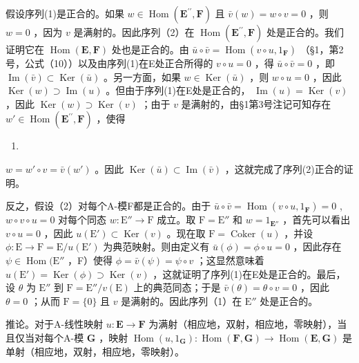 假设序列(1)是正合的。如果 \(w \in \operatorname{Hom}(\mathbf{E}^{\prime \prime}, \mathbf{F})\) 且 \(\bar{v}(w) = w \circ v = 0\) ，则 \(w = 0\) ，因为 \(v\) 是满射的。因此序列（2）在 \(\operatorname{Hom}(\mathbf{E}^{\prime \prime}, \mathbf{F})\) 处是正合的。我们证明它在 \(\operatorname{Hom}(\mathbf{E}, \mathbf{F})\) 处也是正合的。由 \(\bar{u} \circ \bar{v} = \operatorname{Hom}(v \circ u, 1_{\mathbf{F}})\) （§1，第2号，公式（10））以及由序列(1)在E处正合所得的 \(v \circ u = 0\) ，得 \(\bar{u} \circ \bar{v} = 0\) ，即 \(\operatorname{Im}(\bar{v}) \subset \operatorname{Ker}(\bar{u})\) 。另一方面，如果 \(w \in \operatorname{Ker}(\bar{u})\) ，则 \(w \circ u = 0\) ，因此 \(\operatorname{Ker}(w) \supset \operatorname{Im}(u)\) 。但由于序列(1)在E处是正合的， \(\operatorname{Im}(u) = \operatorname{Ker}(v)\) ，因此 \(\operatorname{Ker}(w) \supset \operatorname{Ker}(v)\) ；由于 \(v\) 是满射的，由§1第3号注记可知存在 \(w' \in \operatorname{Hom}(\mathbf{E}^{\prime \prime}, \mathbf{F})\) ，使得

\begin{enumerate}
\def\labelenumi{(\arabic{enumi})}
\setcounter{enumi}{3}
\tightlist
\item
\end{enumerate}

\(w = w' \circ v = \bar{v}(w')\) 。因此 \(\operatorname{Ker}(\bar{u}) \subset \operatorname{Im}(\bar{v})\) ，这就完成了序列(2)正合的证明。

反之，假设（2）对每个A-模F都是正合的。由于 \(\bar{u} \circ \bar{v} = \operatorname{Hom}(v \circ u, 1_{\mathbf{F}}) = 0\) , \(w \circ v \circ u = 0\) 对每个同态 \(w: \mathrm{E}'' \to \mathrm{F}\) 成立。取 \(\mathrm{F} = \mathrm{E}''\) 和 \(w = 1_{\mathbf{E}''}\) ，首先可以看出 \(v \circ u = 0\) ，因此 \(u(\mathrm{E}') \subset \operatorname{Ker}(v)\) 。现在取 \(\mathrm{F} = \operatorname{Coker}(u)\) ，并设 \(\phi: \mathrm{E} \to \mathrm{F} = \mathrm{E}/u(\mathrm{E}')\) 为典范映射。则由定义有 \(\bar{u}(\phi) = \phi \circ u = 0\) ，因此存在 \(\psi \in \operatorname{Hom}(\mathrm{E}''\) ，F）使得 \(\phi = \bar{v}(\psi) = \psi \circ v\) ；这显然意味着 \(u(\mathrm{E}') = \operatorname{Ker}(\phi) \supset \operatorname{Ker}(v)\) ，这就证明了序列(1)在E处是正合的。最后，设 \(\theta\) 为 \(\mathrm{E}''\) 到 \(\mathrm{F} = \mathrm{E}''/v(\mathrm{E})\) 上的典范同态；于是 \(\bar{v}(\theta) = \theta \circ v = 0\) ，因此 \(\theta = 0\) ；从而 \(\mathrm{F} = \{0\}\) 且 \(v\) 是满射的。因此序列（1）在 \(\mathrm{E}''\) 处是正合的。

推论。对于A-线性映射 \(u: \mathbf{E} \to \mathbf{F}\) 为满射（相应地，双射，相应地，零映射），当且仅当对每个A-模 \(\mathbf{G}\) ，映射 \(\operatorname{Hom}(u, 1_{\mathbf{G}}): \operatorname{Hom}(\mathbf{F}, \mathbf{G}) \to \operatorname{Hom}(\mathbf{E}, \mathbf{G})\) 是单射（相应地，双射，相应地，零映射）。

